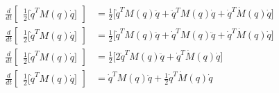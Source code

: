 \documentclass[12pt]{article}
\begin{document}
\begin{enumerate}
\begin{equation}
\begin{split}
            \frac{d}{dt}
            \begin{bmatrix}
            \frac{1}{2}\lbrack\dot{q}^TM(q)\dot{q}\rbrack
            \end{bmatrix}&=\frac{1}{2}\lbrack\dot{q}^TM(q)\ddot{q}+\ddot{q}^TM(q)\dot{q}+\dot{q}^T\dot{M}(q)\dot{q}\rbrack\\
            \frac{d}{dt}
            \begin{bmatrix}
            \frac{1}{2}\lbrack\dot{q}^TM(q)\dot{q}\rbrack
            \end{bmatrix}&=\frac{1}{2}\lbrack\dot{q}^TM(q)\ddot{q}+\dot{q}^TM(q)\ddot{q}+\dot{q}^T\dot{M}(q)\dot{q}\rbrack\\
            \frac{d}{dt}
            \begin{bmatrix}
            \frac{1}{2}\lbrack\dot{q}^TM(q)\dot{q}\rbrack
            \end{bmatrix}&=\frac{1}{2}\lbrack2\dot{q}^TM(q)\ddot{q}+\dot{q}^T\dot{M}(q)\dot{q}\rbrack\\
            \frac{d}{dt}
            \begin{bmatrix}
            \frac{1}{2}\lbrack\dot{q}^TM(q)\dot{q}\rbrack
            \end{bmatrix}&=\dot{q}^TM(q)\ddot{q}+\frac{1}{2}\dot{q}^T\dot{M}(q)\dot{q}\\
        \end{split}
        \label{eq:derivative}
    \end{equation}


\end{enumerate}
\end{document}
